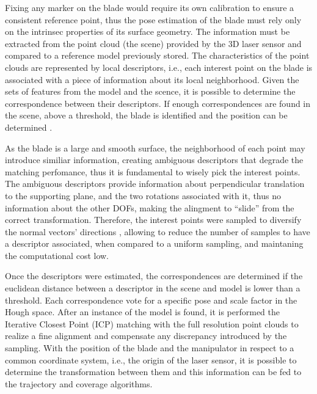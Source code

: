 Fixing any marker on the blade would require its own calibration to ensure a
consistent reference point, thus the pose estimation of the blade must rely only
on the intrinsec properties of its surface geometry. The information must be extracted from
the point cloud (the scene) provided by the 3D laser sensor and
compared to a reference model previously stored. The characteristics of the point clouds are represented
by local descriptors, i.e., each interest point on the blade is associated
with a piece of information about its local neighborhood. Given the
sets of features from the model and the scence,  it is possible to determine the
correspondence between their descriptors. If enough correspondences are found
in the scene, above a threshold, the blade is identified and the position can be
determined \cite{Tombari2010a}.

As the blade is a large and smooth surface, the neighborhood of each point may
introduce similiar information, creating ambiguous descriptors that degrade the
matching perfomance, thus it is fundamental to wisely pick the interest points.
The ambiguous descriptors provide information about perpendicular translation to
the supporting plane, and the two rotations associated with it, thus no
information about the other DOFs, making the alingment to ``slide'' from the
correct transformation. Therefore, the interest points were sampled to
diversify the normal vectors' directions \cite{Rusinkiewicz2001}, allowing to
reduce the number of samples to have a descriptor associated, when compared to a
uniform sampling, and maintaning the computational cost low.


Once the descriptors were estimated, the correspondences are determined if the
euclidean distance between a descriptor in the scene and model is lower than a
threshold. Each correspondence vote for a specific pose and scale factor in the
Hough space. After an instance of the model is found, it is performed the 
Iterative Closest Point (ICP) matching with the full resolution point clouds to
realize a fine alignment and compensate any discrepancy introduced by the
sampling. With the position of the blade and the manipulator in respect to a
common coordinate system, i.e., the origin of the laser sensor, it is possible
to determine the transformation between them and this information can be fed to
the trajectory and coverage algorithms.



